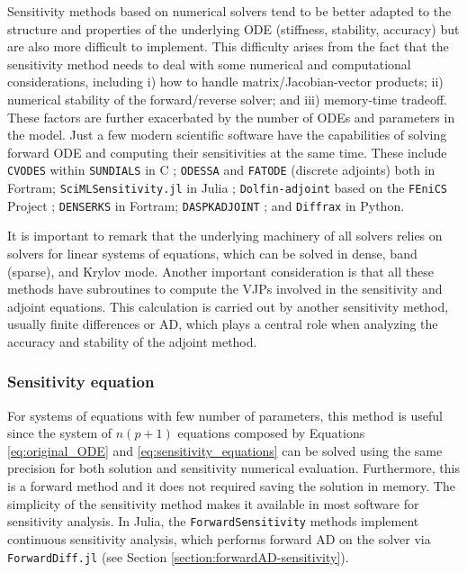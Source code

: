 
Sensitivity methods based on numerical solvers tend to be better adapted to the structure and properties of the underlying ODE (stiffness, stability, accuracy) but are also more difficult to implement.  
This difficulty arises from the fact that the sensitivity method needs to deal with some numerical and computational considerations, including i) how to handle matrix/Jacobian-vector products; ii) numerical stability of the forward/reverse solver; and iii) memory-time tradeoff. 
These factors are further exacerbated by the number of ODEs and parameters in the model. 
Just a few modern scientific software have the capabilities of solving forward ODE and computing their sensitivities at the same time. 
These include 
\texttt{CVODES} within \texttt{SUNDIALS} in C \cite{serban2005cvodes, SUNDIALS-hindmarsh2005sundials}; 
\texttt{ODESSA} \cite{ODESSA} and \texttt{FATODE} (discrete adjoints) \cite{FATODE2014} both in Fortram; 
\texttt{SciMLSensitivity.jl} in Julia \cite{rackauckas2020universal}; 
\texttt{Dolfin-adjoint} based on the \texttt{FEniCS} Project \cite{dolfin2013, dolfin2018};
\texttt{DENSERKS} in Fortram\cite{alexe2007denserks}; 
\texttt{DASPKADJOINT} \cite{Cao_Li_Petzold_2002};
and \texttt{Diffrax} in Python\cite{kidger2021on}. 

It is important to remark that the underlying machinery of all solvers relies on solvers for linear systems of equations, which can be solved in dense, band (sparse), and Krylov mode. 
Another important consideration is that all these methods have subroutines to compute the VJPs involved in the sensitivity and adjoint equations. 
This calculation is carried out by another sensitivity method, usually finite differences or AD, which plays a central role when analyzing the accuracy and stability of the adjoint method. 

\subsubsection{Sensitivity equation}
\label{section:computing-sensitivity-equations}

For systems of equations with few number of parameters, this method is useful since the system of $n(p+1)$ equations composed by Equations \eqref{eq:original_ODE} and \eqref{eq:sensitivity_equations} can be solved using the same precision for both solution and sensitivity numerical evaluation. 
Furthermore, this is a forward method and it does not required saving the solution in memory. 
The simplicity of the sensitivity method makes it available in most software for sensitivity analysis. 
In Julia, the \texttt{ForwardSensitivity} methods implement continuous sensitivity analysis, which performs forward AD on the solver via \texttt{ForwardDiff.jl} (see Section \ref{section:forwardAD-sensitivity}).

